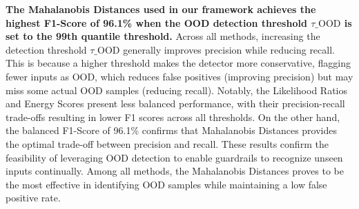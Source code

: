 \textbf{The Mahalanobis Distances used in our framework achieves the highest F1-Score of 96.1\% when the OOD detection threshold $\tau\_{\text{OOD}}$ is set to the 99th quantile threshold.}
Across all methods, increasing the detection threshold $\tau\_{\text{OOD}}$ generally improves precision while reducing recall. This is because a higher threshold makes the detector more conservative, flagging fewer inputs as OOD, which reduces false positives (improving precision) but may miss some actual OOD samples (reducing recall).
Notably, the Likelihood Ratios and Energy Scores present less balanced performance, with their precision-recall trade-offs resulting in lower F1 scores across all thresholds.
On the other hand, the balanced F1-Score of 96.1\% confirms that Mahalanobis Distances provides the optimal trade-off between precision and recall.
These results confirm the feasibility of leveraging OOD detection to enable guardrails to recognize unseen inputs continually. Among all methods, the Mahalanobis Distances proves to be the most effective in identifying OOD samples while maintaining a low false positive rate.

